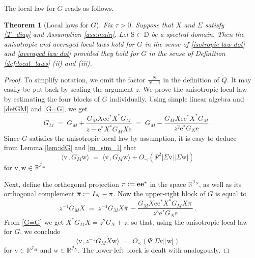 \documentclass[11pt]{article} %
\numberwithin{equation}{section}
\numberwithin{figure}{section}
\theoremstyle{plain} %
\newtheorem{theorem}{Theorem}[section]
\theoremstyle{definition} %
\newcommand{\f}[1]{\boldsymbol{\mathrm{#1}}} %
\renewcommand{\cal}{\mathcal}
\newcommand{\ol}[1]{\overline{#1} \!\,} %
\newcommand{\R}{\mathbb{R}}
\newcommand*{\deq}{\mathrel{\vcenter{\baselineskip0.65ex \lineskiplimit0pt \hbox{.}\hbox{.}}}=}
\newcommand{\abs}[1]{\lvert #1 \rvert}
\newcommand{\scalar}[2]{\langle{#1} \mspace{2mu}, {#2}\rangle}
\begin{document}
The local law for $\dot G$ reads as follows.
\begin{theorem}[Local laws for $\dot G$] \label{thm:local_laws_dot}
Fix $\tau > 0$. Suppose that $X$ and $\Sigma$ satisfy \eqref{T_diag} and Assumption \ref{ass:main}. Let $\f S \subset \f D$ be a spectral domain. Then the anisotropic and averaged local laws hold for $\dot G$ in the sense of \eqref{isotropic law dot} and \eqref{averaged law dot} provided they hold for $G$ in the sense of Definition \ref{def:local_laws} (ii) and (iii).
\end{theorem}

\begin{proof}
To simplify notation, we omit the factor $\frac{N}{N-1}$ in the definition of $\dot Q$. It may easily be put back by scaling the argument $z$.
We prove the anisotropic local law by estimating the four blocks of $\dot G$ individually.
Using simple linear algebra and \eqref{defGM} and \eqref{G=G}, we get
\begin{equation} \label{G_M dot id}
\dot G_M \;=\; G_M + \frac{G_M X \f e \f e^* X^* G_M}{z - \f e^* X^* G_M X \f e} \;=\; G_M - \frac{G_M X \f e \f e^* X^* G_M}{z^2 \f e^* G_N \f e}\,.
\end{equation}
Since $G$ satisfies the anisotropic local law by assumption, it is easy to deduce from Lemma \ref{lem:idG} and \eqref{m_sim_1} that
\begin{equation*}
\scalar{\f v}{\dot G_{M} \f w} \;=\; \scalar{\f v}{G_{M} \f w} + O_\prec(\Psi^2 \abs{\Sigma \f v} \abs{\Sigma \f w})
\end{equation*}
for $\f v , \f w \in \R^{\cal I_M}$.

Next, define the orthogonal projection $\pi \deq \f e \f e^*$ in the space $\R^{\cal I_N}$, as well as its orthogonal complement $\ol \pi \deq I_N - \pi$. Now the upper-right block of $\dot G$ is equal to
\begin{equation*}
z^{-1} \dot G_M \dot X \;=\; z^{-1} G_M X \ol \pi - \frac{G_M X \f e \f e^* X^* G_M X \ol \pi}{z^3 \f e^* G_N \f e}\,.
\end{equation*}
From \eqref{G=G} we get $X^* G_M X = z^2 G_N + z$, so that, using the anisotropic local law for $G$, we conclude
\begin{equation*}
\scalar{\f v}{z^{-1} \dot G_M \dot X \f w} \;=\; O_\prec(\Psi \abs{\Sigma \f v} \abs{\f w})
\end{equation*}
for $\f v \in \R^{\cal I_M}$ and $\f w \in \R^{\cal I_N}$. The lower-left block is dealt with analogously.


\end{proof}
\end{document}
